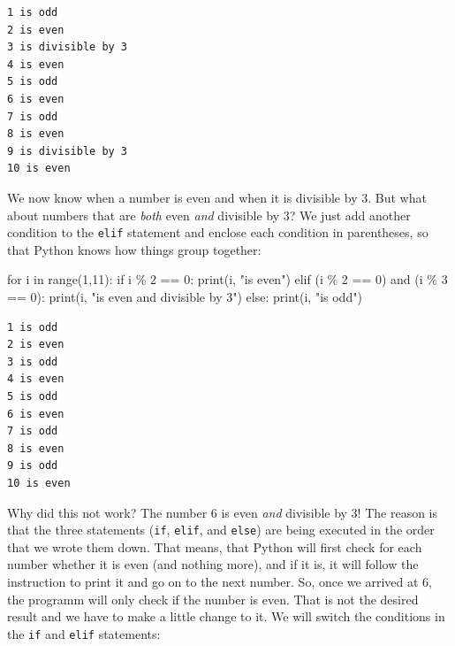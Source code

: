 \documentclass[
  a4paperpaper,
  ,captions=tableheading
]{scrbook}
\newenvironment{Shaded}{\begin{snugshade}}{\end{snugshade}}
\newcommand{\BuiltInTok}[1]{\textcolor[rgb]{0.00,0.23,0.31}{#1}}
\newcommand{\ControlFlowTok}[1]{\textcolor[rgb]{0.00,0.23,0.31}{#1}}
\newcommand{\DecValTok}[1]{\textcolor[rgb]{0.68,0.00,0.00}{#1}}
\newcommand{\KeywordTok}[1]{\textcolor[rgb]{0.00,0.23,0.31}{#1}}
\newcommand{\NormalTok}[1]{\textcolor[rgb]{0.00,0.23,0.31}{#1}}
\newcommand{\OperatorTok}[1]{\textcolor[rgb]{0.37,0.37,0.37}{#1}}
\newcommand{\StringTok}[1]{\textcolor[rgb]{0.13,0.47,0.30}{#1}}
\begin{document}
\begin{verbatim}
1 is odd
2 is even
3 is divisible by 3
4 is even
5 is odd
6 is even
7 is odd
8 is even
9 is divisible by 3
10 is even
\end{verbatim}

We now know when a number is even and when it is divisible by 3. But
what about numbers that are \emph{both} even \emph{and} divisible by 3?
We just add another condition to the \texttt{elif} statement and enclose
each condition in parentheses, so that Python knows how things group
together:

\begin{Shaded}
\begin{Highlighting}[]
\ControlFlowTok{for}\NormalTok{ i }\KeywordTok{in} \BuiltInTok{range}\NormalTok{(}\DecValTok{1}\NormalTok{,}\DecValTok{11}\NormalTok{):}
    \ControlFlowTok{if}\NormalTok{ i }\OperatorTok{\%} \DecValTok{2} \OperatorTok{==} \DecValTok{0}\NormalTok{:}
        \BuiltInTok{print}\NormalTok{(i, }\StringTok{"is even"}\NormalTok{)}
    \ControlFlowTok{elif}\NormalTok{ (i }\OperatorTok{\%} \DecValTok{2} \OperatorTok{==} \DecValTok{0}\NormalTok{) }\KeywordTok{and}\NormalTok{ (i }\OperatorTok{\%} \DecValTok{3} \OperatorTok{==} \DecValTok{0}\NormalTok{):}
        \BuiltInTok{print}\NormalTok{(i, }\StringTok{"is even and divisible by 3"}\NormalTok{)}
    \ControlFlowTok{else}\NormalTok{:}
        \BuiltInTok{print}\NormalTok{(i, }\StringTok{"is odd"}\NormalTok{)}
\end{Highlighting}
\end{Shaded}

\begin{verbatim}
1 is odd
2 is even
3 is odd
4 is even
5 is odd
6 is even
7 is odd
8 is even
9 is odd
10 is even
\end{verbatim}

Why did this not work? The number 6 is even \emph{and} divisible by 3!
The reason is that the three statements (\texttt{if}, \texttt{elif}, and
\texttt{else}) are being executed in the order that we wrote them down.
That means, that Python will first check for each number whether it is
even (and nothing more), and if it is, it will follow the instruction to
print it and go on to the next number. So, once we arrived at 6, the
programm will only check if the number is even. That is not the desired
result and we have to make a little change to it. We will switch the
conditions in the \texttt{if} and \texttt{elif} statements:
\end{document}

